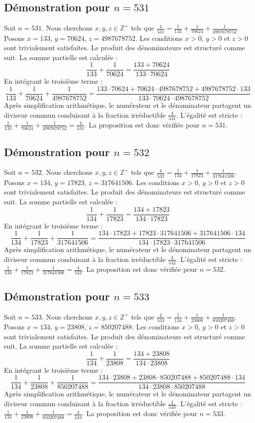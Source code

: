 \documentclass[11pt,a4paper]{article}
\begin{document}
\subsection{Démonstration pour $n = 531$}
Soit $n = 531$. Nous cherchons $x, y, z \in \mathbb{Z}^{+}$ tels que $\frac{4}{531} = \frac{1}{133} + \frac{1}{70624} + \frac{1}{4987678752}$.
Posons $x = 133$, $y = 70624$, $z = 4987678752$.
Les conditions $x > 0$, $y > 0$ et $z > 0$ sont trivialement satisfaites.
Le produit des dénominateurs est structuré comme suit. La somme partielle est calculée :
$$ \frac{1}{133} + \frac{1}{70624} = \frac{133+70624}{133 \cdot 70624} $$
En intégrant le troisième terme :
$$ \frac{1}{133} + \frac{1}{70624} + \frac{1}{4987678752} = \frac{133 \cdot 70624 + 70624 \cdot 4987678752 + 4987678752 \cdot 133}{133 \cdot 70624 \cdot 4987678752} $$
Après simplification arithmétique, le numérateur et le dénominateur partagent un diviseur commun conduisant à la fraction irréductible $\frac{4}{531}$.
L'égalité est stricte : $\frac{1}{133} + \frac{1}{70624} + \frac{1}{4987678752} = \frac{4}{531}$.
La proposition est donc vérifiée pour $n = 531$.
\subsection{Démonstration pour $n = 532$}
Soit $n = 532$. Nous cherchons $x, y, z \in \mathbb{Z}^{+}$ tels que $\frac{4}{532} = \frac{1}{134} + \frac{1}{17823} + \frac{1}{317641506}$.
Posons $x = 134$, $y = 17823$, $z = 317641506$.
Les conditions $x > 0$, $y > 0$ et $z > 0$ sont trivialement satisfaites.
Le produit des dénominateurs est structuré comme suit. La somme partielle est calculée :
$$ \frac{1}{134} + \frac{1}{17823} = \frac{134+17823}{134 \cdot 17823} $$
En intégrant le troisième terme :
$$ \frac{1}{134} + \frac{1}{17823} + \frac{1}{317641506} = \frac{134 \cdot 17823 + 17823 \cdot 317641506 + 317641506 \cdot 134}{134 \cdot 17823 \cdot 317641506} $$
Après simplification arithmétique, le numérateur et le dénominateur partagent un diviseur commun conduisant à la fraction irréductible $\frac{4}{532}$.
L'égalité est stricte : $\frac{1}{134} + \frac{1}{17823} + \frac{1}{317641506} = \frac{4}{532}$.
La proposition est donc vérifiée pour $n = 532$.
\subsection{Démonstration pour $n = 533$}
Soit $n = 533$. Nous cherchons $x, y, z \in \mathbb{Z}^{+}$ tels que $\frac{4}{533} = \frac{1}{134} + \frac{1}{23808} + \frac{1}{850207488}$.
Posons $x = 134$, $y = 23808$, $z = 850207488$.
Les conditions $x > 0$, $y > 0$ et $z > 0$ sont trivialement satisfaites.
Le produit des dénominateurs est structuré comme suit. La somme partielle est calculée :
$$ \frac{1}{134} + \frac{1}{23808} = \frac{134+23808}{134 \cdot 23808} $$
En intégrant le troisième terme :
$$ \frac{1}{134} + \frac{1}{23808} + \frac{1}{850207488} = \frac{134 \cdot 23808 + 23808 \cdot 850207488 + 850207488 \cdot 134}{134 \cdot 23808 \cdot 850207488} $$
Après simplification arithmétique, le numérateur et le dénominateur partagent un diviseur commun conduisant à la fraction irréductible $\frac{4}{533}$.
L'égalité est stricte : $\frac{1}{134} + \frac{1}{23808} + \frac{1}{850207488} = \frac{4}{533}$.
La proposition est donc vérifiée pour $n = 533$.
\end{document}
